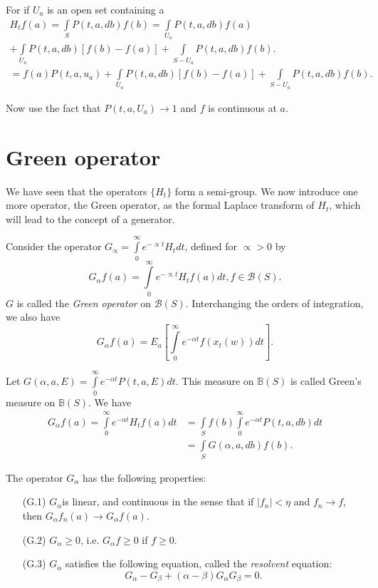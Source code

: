 For if $U_a$ is an open set containing a 
\begin{multline*}
  H_t f(a) = \int\limits_{S} P(t,a,db) f(b) = \int\limits_{U_a}
  P(t,a, db) f(a) \\ 
  + \int\limits_{U_a} P(t,a, db) [ f(b) - f(a) ] +
  \int\limits_{S-U_a} P(t,a,db) f(b).\\ 
   = f(a) P (t,a,u_a) + \int\limits_{U_a}P(t,a,db) [f(b) - f(a) ] +
  \int\limits_{S-U_a} P (t,a, db) f(b). 
\end{multline*}\pageoriginale

Now use the fact that $P(t,a, U_a) \to 1$ and $f$ is continuous at $a$.

\section{Green operator}\label{chap1-sec5} 

We have seen that the operators $\{ H_t\}$ form a semi-group. We now
introduce one more operator, the Green operator, as the formal Laplace
transform of $H_t$, which will lead to the concept of a generator. 

Consider the operator $G_\propto = \int\limits_{0}^{\infty} e^{-
\propto t} H_t dt$, defined for $\propto >0$ by  
$$
G_\alpha f(a)= \int\limits_{0}^\infty e^{- \propto t} H_t f(a) dt, f
\in \mathscr{B}(S). 
$$
$G$ is called the \textit{Green operator} on
$\mathscr{B}(S)$. Interchanging the orders of integration, we also
have  
$$
G_\alpha f(a) = E_a \left[ \int\limits_{0}^\infty e^{- \alpha t} f(x_t
  (w)) dt \right]. 
$$

Let $G(\alpha, a, E) = \int\limits_{0}^\infty  e^{- \alpha t}
P(t,a, E) dt$. This measure on $\mathbb{B}(S)$ is called Green's
measure on $\mathbb{B} (S)$. We have  
\begin{align*}
  G_\alpha f(a) = \int\limits_{0}^\infty e^{- \alpha t}H_t f(a) dt &=
  \int\limits_{S} f(b) \int\limits_{0}^\infty e^{- \alpha t} P(t,a,db)
  dt \\ 
  &= \int\limits_{S}G(\alpha, a, db ) f(b).
\end{align*}

The operator $G_\alpha$ has the following properties:
\begin{itemize}
\item[(G.1)] $G_\alpha$\pageoriginale is linear, and continuous in the
  sense that if 
  $|f_n | < \eta$ and $f_n \to f$, then $G_\alpha f_n (a) \to
  G_\alpha f(a)$. 
\item[(G.2)] $G_\alpha \ge 0$, i.e.  $G_\alpha f \ge 0$ if $f \ge 0$.  
\item[(G.3)] $G_\alpha$ satisfies the following equation, called the
  \textit{resolvent} equation: 
  $$
  G_\alpha - G_\beta + ( \alpha - \beta) G_\alpha G_\beta =0.
  $$ 
\end{itemize}

